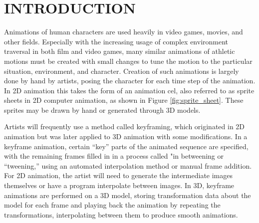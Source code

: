 
 
\chapter{INTRODUCTION}
\label{chapter:intro}

Animations of human characters are used heavily in video games, movies, and other fields.  Especially with the increasing usage of complex environment traversal in both film and video games, many similar animations of athletic motions must be created with small changes to tune the motion to the particular situation, environment, and character.  Creation of such animations is largely done by hand by artists, posing the character for each time step of the animation.  In 2D animation this takes the form of an animation cel, also referred to as sprite sheets in 2D computer animation, as shown in Figure \ref{fig:sprite_sheet}.  These sprites may be drawn by hand or generated through 3D models.

Artists will frequently use a method called keyframing, which originated in 2D animation but was later applied to 3D animation with some modifications.  In a keyframe animation, certain ``key'' parts of the animated sequence are specified, with the remaining frames filled in in a process called "in betweening or ``tweening,'' using an automated interpolation method or manual frame addition.  For 2D animation, the artist will need to generate the intermediate images themselves or have a program interpolate between images.  In 3D, keyframe animations are performed on a 3D model, storing transformation data about the model for each frame and playing back the animation by repeating the transformations, interpolating between them to produce smooth animations.

